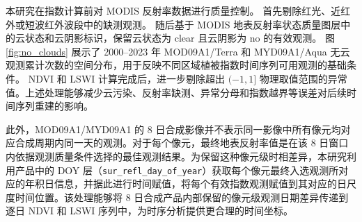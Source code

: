 
本研究在指数计算前对 MODIS 反射率数据进行质量控制。
首先剔除红光、近红外或短波红外波段中的缺测观测。
随后基于 MODIS 地表反射率状态质量图层中的云状态和云阴影标识，保留云状态为 clear 且云阴影为 no 的有效观测。
图 \ref{fig:no_clouds} 展示了 2000--2023 年 MOD09A1/Terra 和 MYD09A1/Aqua 无云观测累计次数的空间分布，用于反映不同区域植被指数时间序列可用观测的基础条件。
NDVI 和 LSWI 计算完成后，进一步剔除超出 $(-1, 1]$ 物理取值范围的异常值。上述处理能够减少云污染、反射率缺测、异常分母和指数越界等误差对后续时间序列重建的影响。

此外，MOD09A1/MYD09A1 的 8 日合成影像并不表示同一影像中所有像元均对应合成周期内同一天的观测。对于每个像元，最终地表反射率值是在该 8 日窗口内依据观测质量条件选择的最佳观测结果。为保留这种像元级时相差异，本研究利用产品中的 DOY 层（\texttt{sur\_refl\_day\_of\_year}）获取每个像元最终入选观测所对应的年积日信息，并据此进行时间赋值，将每个有效指数观测赋值到其对应的日尺度时间位置。该处理能够将 8 日合成产品内部保留的像元级观测日期差异传递到逐日 NDVI 和 LSWI 序列中，为时序分析提供更合理的时间坐标。


